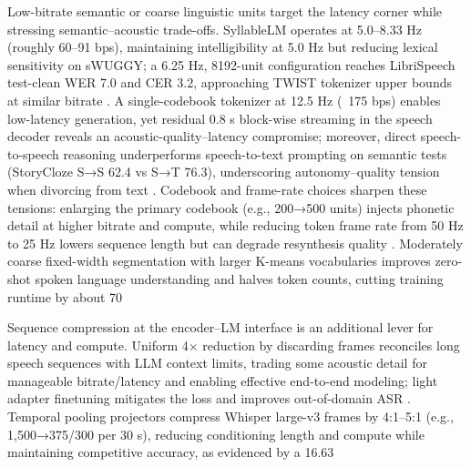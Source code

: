 \documentclass{article}
\begin{document}
Low-bitrate semantic or coarse linguistic units target the latency corner while stressing semantic–acoustic trade-offs. SyllableLM operates at 5.0–8.33 Hz (roughly 60–91 bps), maintaining intelligibility at 5.0 Hz but reducing lexical sensitivity on sWUGGY; a 6.25 Hz, 8192-unit configuration reaches LibriSpeech test-clean WER 7.0 and CER 3.2, approaching TWIST tokenizer upper bounds at similar bitrate \cite{baade2024syllablelmlearningcoarsesemanticunitsspe}. A single-codebook tokenizer at 12.5 Hz (~175 bps) enables low-latency generation, yet residual 0.8 s block-wise streaming in the speech decoder reveals an acoustic-quality–latency compromise; moreover, direct speech-to-speech reasoning underperforms speech-to-text prompting on semantic tests (StoryCloze S→S 62.4 vs S→T 76.3), underscoring autonomy–quality tension when divorcing from text \cite{zeng2024glm4voicetowardsintelligenthumanlikeends}. Codebook and frame-rate choices sharpen these tensions: enlarging the primary codebook (e.g., 200→500 units) injects phonetic detail at higher bitrate and compute, while reducing token frame rate from 50 Hz to 25 Hz lowers sequence length but can degrade resynthesis quality \cite{chang2024dcspinspeakerinvariantspeechtokenizerspo}. Moderately coarse fixed-width segmentation with larger K-means vocabularies improves zero-shot spoken language understanding and halves token counts, cutting training runtime by about 70%



Sequence compression at the encoder–LM interface is an additional lever for latency and compute. Uniform 4× reduction by discarding frames reconciles long speech sequences with LLM context limits, trading some acoustic detail for manageable bitrate/latency and enabling effective end-to-end modeling; light adapter finetuning mitigates the loss and improves out-of-domain ASR \cite{wang2023slmbridgethingapbetweenspeechtextfoundat}. Temporal pooling projectors compress Whisper large-v3 frames by 4:1–5:1 (e.g., 1,500→375/300 per 30 s), reducing conditioning length and compute while maintaining competitive accuracy, as evidenced by a 16.63%
\end{document}
